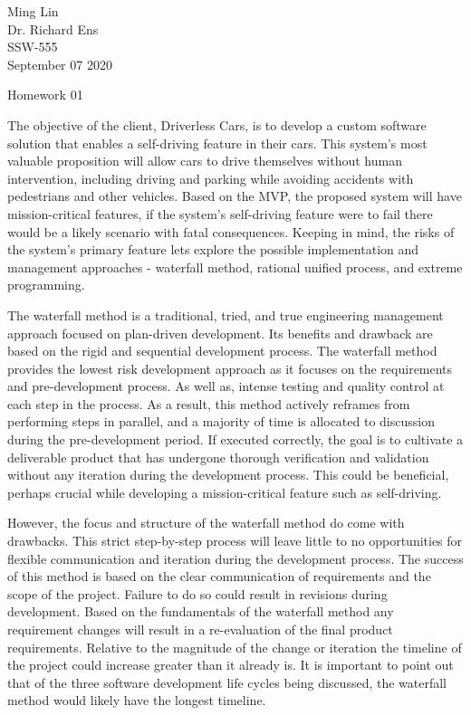 \documentclass[12pt]{article}
\begin{document}
\begin{flushleft}

Ming Lin\\
Dr. Richard Ens\\
SSW-555\\
September 07 2020\\


\begin{center}
Homework 01
\end{center}


\setlength{\parindent}{0.5in}

The objective of the client, Driverless Cars, is to develop a custom software solution that enables a 
self-driving feature in their cars. This system's most valuable proposition will allow cars
to drive themselves without human intervention, including driving and parking while avoiding accidents 
with pedestrians and other vehicles. Based on the MVP, the proposed system will have mission-critical features, 
if the system's self-driving feature were to fail there would be a likely scenario with fatal consequences. Keeping in mind,
the risks of the system's primary feature lets explore the possible implementation and management approaches - 
waterfall method, rational unified process, and extreme programming.

The waterfall method is a traditional, tried, and true engineering management approach focused on plan-driven development. Its benefits and drawback 
are based on the rigid and sequential development process. The waterfall method provides the lowest risk development 
approach as it focuses on the requirements and pre-development process. As well as, intense testing and quality control 
at each step in the process. As a result, this method actively reframes from performing steps in parallel, and a majority 
of time is allocated to discussion during the pre-development period. If executed correctly, the goal is to cultivate a 
deliverable product that has undergone thorough verification and validation without any iteration during the development 
process. This could be beneficial, perhaps crucial while developing a mission-critical feature such as self-driving.

However, the focus and structure of the waterfall method do come with drawbacks. This strict step-by-step process will 
leave little to no opportunities for flexible communication and iteration during the development process. The success of 
this method is based on the clear communication of requirements and the scope of the project. Failure to do so could result 
in revisions during development. Based on the fundamentals of the waterfall method any requirement changes will result
in a  re-evaluation of the final product requirements. Relative to the magnitude of the change or iteration the timeline 
of the project could increase greater than it already is. It is important to point out that of the three software development 
life cycles being discussed, the waterfall method would likely have the longest timeline.


\end{flushleft}
\end{document}
